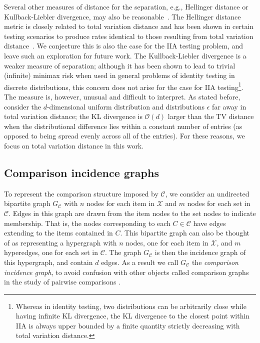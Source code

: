 \documentclass[10pt]{article}
\begin{document}
\begin{ReviewVerbatim}
	Several other measures of distance for the separation, e.g., Hellinger distance or Kullback-Liebler divergence, may also be reasonable~\cite{acharya2015optimal,daskalakis2018distribution}. The Hellinger distance metric is closely related to total variation distance and has been shown in certain testing scenarios to produce rates identical to those resulting from total variation distance~\cite{daskalakis2018distribution}. We conjecture this is also the case for the IIA testing problem, and leave such an exploration for future work. The Kullback-Liebler divergence is a weaker measure of separation; although it has been shown to lead to trivial (infinite) minimax risk when used in general problems of identity testing in discrete distributions, this concern does not arise for the case for IIA testing\footnote{Whereas in identity testing, two distributions can be arbitrarily close while having infinite KL divergence, the KL divergence to the closest point within IIA is always upper bounded by a finite quantity strictly decreasing with total variation distance.}. The measure is, however, unusual and difficult to interpret. As stated before, consider the $d$-dimensional uniform distribution and distributions $\epsilon$ far away in total variation distance; the KL divergence is $\mathcal{O}(d)$ larger than the TV distance when the distributional difference lies within a constant number of entries (as opposed to being spread evenly across all of the entries). For these reasons, we focus on total variation distance in this work.

	\subsection{Comparison incidence graphs}\label{subsection:comparison_graph}
	To represent the comparison structure imposed by $\mathcal{C}$, we consider an undirected bipartite graph $G_\mathcal{C}$ with $n$ nodes for each item in $\mathcal{X}$ and $m$ nodes for each set in $\mathcal{C}$. Edges in this graph are drawn from the item nodes to the set nodes to indicate membership. That is, the nodes corresponding to each $C \in \mathcal{C}$ have edges extending to the items contained in $C$. This bipartite graph can also be thought of as representing a hypergraph with $n$ nodes, one for each item in $\mathcal{X}$, and $m$ hyperedges, one for each set in $\mathcal{C}$. The graph $G_\mathcal{C}$ is then the incidence graph of this hypergraph, and contain $d$ edges. As a result we call $G_\mathcal{C}$ the {\it comparison incidence graph}, to avoid confusion with other objects called comparison graphs in the study of pairwise comparisons \cite{ford1957solution,negahban2016rank}.


\end{ReviewVerbatim}
\end{document}
